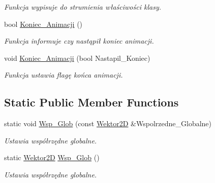 \begin{DoxyCompactItemize}
\begin{DoxyCompactList}\small\item\em Funkcja wypisuje do strumienia właściwości klasy. \end{DoxyCompactList}\item 
bool \hyperlink{class_objekt___graficzny_ac3028c59aa6332787b63e0f79fa69d52}{Koniec\+\_\+\+Animacji} ()
\begin{DoxyCompactList}\small\item\em Funkcja informuje czy nastąpił koniec animacji. \end{DoxyCompactList}\item 
void \hyperlink{class_objekt___graficzny_ae830af8c088c3f056a29b85eb62ca482}{Koniec\+\_\+\+Animacji} (bool Nastapil\+\_\+\+Koniec)
\begin{DoxyCompactList}\small\item\em Funkcja ustawia flagę końca animacji. \end{DoxyCompactList}\end{DoxyCompactItemize}
\subsection*{Static Public Member Functions}
\begin{DoxyCompactItemize}
\item 
\hypertarget{class_objekt___graficzny_a3c2618724fff0c58433d50f811a166f5}{static void \hyperlink{class_objekt___graficzny_a3c2618724fff0c58433d50f811a166f5}{Wsp\+\_\+\+Glob} (const \hyperlink{class_wektor2_d}{Wektor2\+D} \&Wspolrzedne\+\_\+\+Globalne)}\label{class_objekt___graficzny_a3c2618724fff0c58433d50f811a166f5}

\begin{DoxyCompactList}\small\item\em Ustawia współrzędne globalne. \end{DoxyCompactList}\item 
\hypertarget{class_objekt___graficzny_ae2372551a897cab2b7ce0fadbb31ed5e}{static \hyperlink{class_wektor2_d}{Wektor2\+D} \hyperlink{class_objekt___graficzny_ae2372551a897cab2b7ce0fadbb31ed5e}{Wsp\+\_\+\+Glob} ()}\label{class_objekt___graficzny_ae2372551a897cab2b7ce0fadbb31ed5e}

\begin{DoxyCompactList}\small\item\em Ustawia współrzędne globalne. \end{DoxyCompactList}\end{DoxyCompactItemize}
